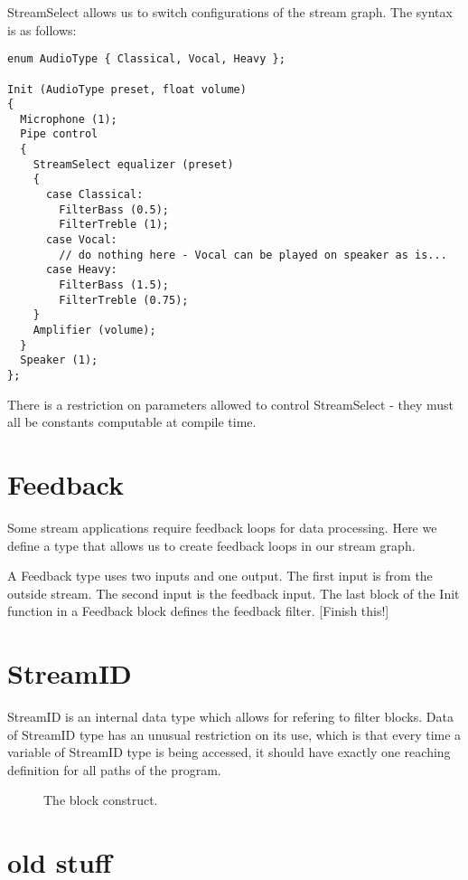 StreamSelect allows us to switch configurations of the stream graph.
The syntax is as follows:

\begin{verbatim}
enum AudioType { Classical, Vocal, Heavy };

Init (AudioType preset, float volume)
{
  Microphone (1);
  Pipe control
  {
    StreamSelect equalizer (preset)
    {
      case Classical:
        FilterBass (0.5);
        FilterTreble (1);
      case Vocal:
        // do nothing here - Vocal can be played on speaker as is...
      case Heavy:
        FilterBass (1.5);
        FilterTreble (0.75);
    }
    Amplifier (volume);
  }
  Speaker (1);
};
\end{verbatim}

There is a restriction on parameters allowed to control StreamSelect - they
must all be constants computable at compile time.

\section{Feedback}

Some stream applications require feedback loops for data processing.
Here we define a type that allows us to create feedback loops
in our stream graph.

A Feedback type uses two inputs and one output.  The first input
is from the outside stream.  The second input is the feedback input.
The last block of the Init function in a Feedback block defines
the feedback filter.  [Finish this!]

\section{StreamID}

StreamID is an internal data type which allows for refering
to filter blocks.  Data of StreamID type has an unusual restriction on its
use, which is that every time a variable of StreamID type is being
accessed, it should have exactly one reaching definition for all
paths of the program.

\begin{figure}[t]
\centerline{}
\vspace{-24pt}
\caption{\protect\small The block construct.}
\end{figure}

\section{old stuff}

\begin{lgrind}

\end{lgrind}




